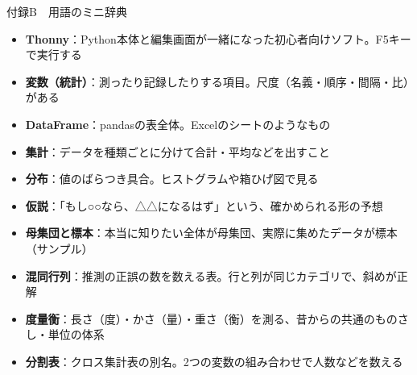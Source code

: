 \documentclass[aspectratio=169,11pt]{beamer}
\begin{document}
\begin{frame}{付録B　用語のミニ辞典}
\begin{itemize}
\item \textbf{Thonny}：Python本体と編集画面が一緒になった初心者向けソフト。F5キーで実行する
\item \textbf{変数（統計）}：測ったり記録したりする項目。尺度（名義・順序・間隔・比）がある
\item \textbf{DataFrame}：pandasの表全体。Excelのシートのようなもの
\item \textbf{集計}：データを種類ごとに分けて合計・平均などを出すこと
\item \textbf{分布}：値のばらつき具合。ヒストグラムや箱ひげ図で見る
\item \textbf{仮説}：「もし○○なら、△△になるはず」という、確かめられる形の予想
\item \textbf{母集団と標本}：本当に知りたい全体が母集団、実際に集めたデータが標本（サンプル）
\item \textbf{混同行列}：推測の正誤の数を数える表。行と列が同じカテゴリで、斜めが正解
\item \textbf{度量衡}：長さ（度）・かさ（量）・重さ（衡）を測る、昔からの共通のものさし・単位の体系
\item \textbf{分割表}：クロス集計表の別名。2つの変数の組み合わせで人数などを数える
\end{itemize}
\end{frame}
\end{document}
